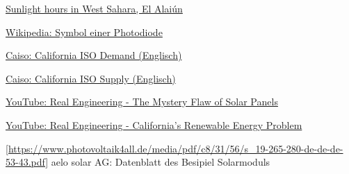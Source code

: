 \begin{thebibliography}{9}
        \href{https://www.timeanddate.com/astronomy/western-sahara/el-aaiun}{
            Sunlight hours in West Sahara, El Alaiún
        }

        \href{https://de.wikipedia.org/wiki/Datei:Symbol_Photodiode.svg}{
            Wikipedia: Symbol einer Photodiode
        }

        \href{http://www.caiso.com/TodaysOutlook/Pages/index.html}{
            Caiso: California ISO Demand (Englisch)
        }

        \href{http://www.caiso.com/TodaysOutlook/Pages/supply.html}{
            Caiso: California ISO Supply (Englisch)
        }

        \href{https://www.youtube.com/watch?v=yVOnHWnLSeU}{
            YouTube: Real Engineering - The Mystery Flaw of Solar Panels
        }

        \href{https://www.youtube.com/watch?v=h5cm7HOAqZY}{
            YouTube: Real Engineering - California's Renewable Energy Problem
        }

        \ref{https://www.photovoltaik4all.de/media/pdf/c8/31/56/s_19-265-280-de-de-de-53-43.pdf}{
            aelo solar AG: Datenblatt des Besipiel Solarmoduls
        }
\end{thebibliography}